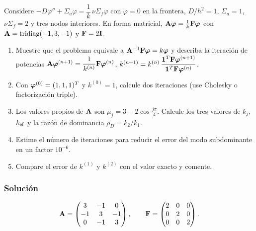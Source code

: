 
\begin{enunciado}
	Considere $-D\varphi'' + \Sigma_a\varphi = \dfrac1k\,\nu\Sigma_f\varphi$ con $\varphi = 0$ en la frontera,
	$D/h^2 = 1$, $\Sigma_a = 1$, $\nu\Sigma_f = 2$ y tres nodos interiores. En forma matricial,
	$\mathbf{A}\bm{\varphi} = \frac1k\mathbf{F}\bm{\varphi}$ con $\mathbf{A} = \operatorname{tridiag}(-1, 3, -1)$ y $\mathbf{F} = 2\mathbf{I}$.
	\begin{enumerate}[label=(\alph*)]
		\item Muestre que el problema equivale a $\mathbf{A}^{-1}\mathbf{F}\bm{\varphi} = k\bm{\varphi}$ y describa la
		iteración de potencias
		$\mathbf{A}\bm{\varphi}^{(n+1)} = \dfrac{1}{k^{(n)}}\mathbf{F}\bm{\varphi}^{(n)}$,\quad
		$k^{(n+1)} = k^{(n)}\,\dfrac{\bm{1}^T\mathbf{F}\bm{\varphi}^{(n+1)}}{\bm{1}^T\mathbf{F}\bm{\varphi}^{(n)}}$.
		\item Con $\bm{\varphi}^{(0)} = (1, 1, 1)^T$ y $k^{(0)} = 1$, calcule dos iteraciones
		(use Cholesky o factorización triple).
		\item Los valores propios de $\mathbf{A}$ son $\mu_j = 3 - 2\cos\frac{j\pi}{4}$. Calcule los tres valores
		de $k_j$, $k_{\mathrm{ef}}$ y la razón de dominancia $\rho_D = k_2/k_1$.
		\item Estime el número de iteraciones para reducir el error del modo subdominante en un factor $10^{-6}$.
		\item Compare el error de $k^{(1)}$ y $k^{(2)}$ con el valor exacto y comente.
	\end{enumerate}
\end{enunciado}

\subsubsection*{Solución}
\[
\mathbf{A} = \begin{pmatrix} 3 & -1 & 0\\ -1 & 3 & -1\\ 0 & -1 & 3 \end{pmatrix},
\qquad
\mathbf{F} = \begin{pmatrix} 2 & 0 & 0\\ 0 & 2 & 0\\ 0 & 0 & 2 \end{pmatrix}.
\]

